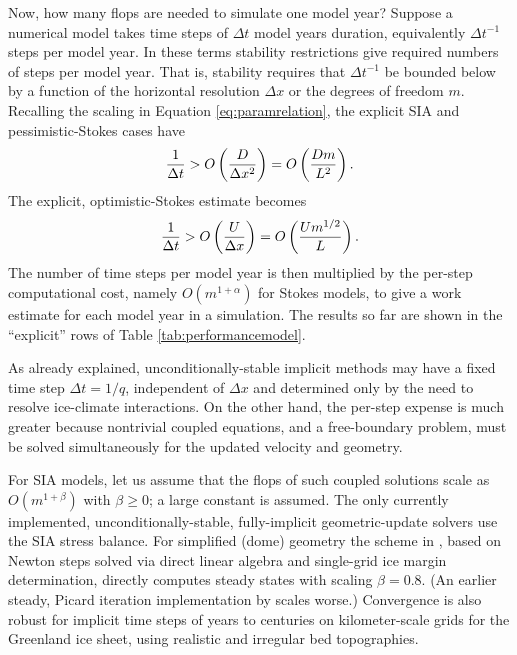 \documentclass[review,letterpaper]{igs}
\begin{document}
Now, how many flops are needed to simulate one model year?  Suppose a numerical model takes time steps of $\Delta t$ model years duration, equivalently $\Delta t^{-1}$ steps per model year.  In these terms stability restrictions give required numbers of steps per model year.  That is, stability requires that $\Delta t^{-1}$ be bounded below by a function of the horizontal resolution $\Delta x$ or the degrees of freedom $m$.  Recalling the scaling in Equation \eqref{eq:paramrelation}, the explicit SIA and pessimistic-Stokes cases have
\begin{equation}
\frac{1}{\Delta t} > \displaystyle O\left(\frac{D}{\Delta x^2}\right) = \displaystyle O\left(\frac{D m}{L^2}\right). \label{eq:explicitsiarequired}
\end{equation}
The explicit, optimistic-Stokes estimate becomes
\begin{equation}
\frac{1}{\Delta t} > \displaystyle O\left(\frac{U}{\Delta x}\right) = \displaystyle O\left(\frac{U m^{1/2}}{L}\right). \label{eq:explicitoptstokesrequired}
\end{equation}
The number of time steps per model year is then multiplied by the per-step computational cost, namely $O(m^{1+\alpha})$ for Stokes models, to give a work estimate for each model year in a simulation.  The results so far are shown in the ``explicit'' rows of Table \ref{tab:performancemodel}.

As already explained, unconditionally-stable implicit methods may have a fixed time step $\Delta t = 1/q$, independent of $\Delta x$ and determined only by the need to resolve ice-climate interactions.  On the other hand, the per-step expense is much greater because nontrivial coupled equations, and a free-boundary problem, must be solved simultaneously for the updated velocity and geometry.

For SIA models, let us assume that the flops of such coupled solutions scale as $O(m^{1+\beta})$ with $\beta \ge 0$; a large constant is assumed.  The only currently implemented, unconditionally-stable, fully-implicit geometric-update solvers use the SIA stress balance.  For simplified (dome) geometry the scheme in \cite{Bueler2016}, based on Newton steps solved via direct linear algebra and single-grid ice margin determination, directly computes steady states with scaling $\beta=0.8$.  (An earlier steady, Picard iteration implementation by \cite{JouvetBueler2012} scales worse.)  Convergence is also robust for implicit time steps of years to centuries on kilometer-scale grids for the Greenland ice sheet, using realistic and irregular bed topographies.
\end{document}
